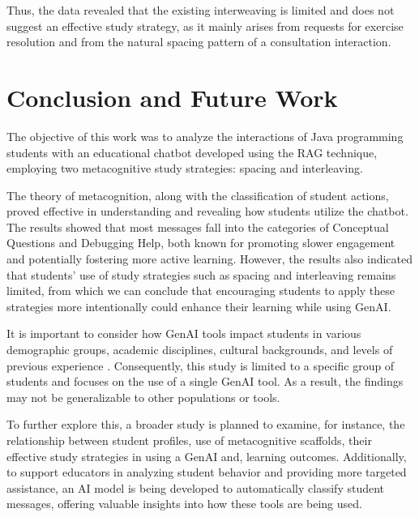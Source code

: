 \documentclass[a4paper,twoside]{article}
\begin{document}
Thus, the data revealed that the existing interweaving is limited and does not
suggest an effective study strategy, as it mainly arises from requests for
exercise resolution and from the natural spacing pattern of a consultation
interaction.

\section{Conclusion and Future Work}

The objective of this work was to analyze the interactions of Java programming
students with an educational chatbot developed using the RAG technique, employing
two metacognitive study strategies: spacing and interleaving.

The theory of metacognition, along with the classification of student actions,
proved effective in understanding and revealing how students utilize the chatbot.
The results showed that most messages fall into the categories of Conceptual
Questions and Debugging Help, both known for promoting slower engagement and
potentially fostering more active learning. However, the results also indicated
that students' use of study strategies such as spacing and interleaving remains
limited, from which we can conclude that encouraging students to apply these
strategies more intentionally could enhance their learning while using GenAI.

It is important to consider how GenAI tools impact students in various
demographic groups, academic disciplines, cultural backgrounds, and levels of
previous experience \citep{catalan21} \citep{neo22}. Consequently, this study is
limited to a specific group of students and focuses on the use of a single GenAI
tool. As a result, the findings may not be generalizable to other populations or
tools.

To further explore this, a broader study is planned to examine, for instance,
the relationship between student profiles, use of metacognitive scaffolds, their
effective study strategies in using a GenAI and, learning outcomes.
Additionally, to support educators in analyzing student behavior and providing
more targeted assistance, an AI model is being developed to automatically
classify student messages, offering valuable insights into how these tools are
being used.


{\small
}
\end{document}
